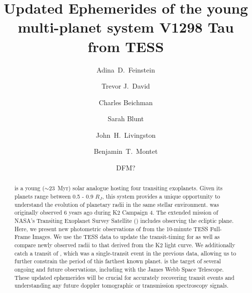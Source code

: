 \documentclass[twocolumn]{aastex631}
\begin{document}
\title{Updated Ephemerides of the young multi-planet system V1298 Tau from TESS}

\author[0000-0002-9464-8101]{Adina~D.~Feinstein}

\author[0000-0001-6534-6246]{Trevor J.\ David}

\author{Charles Beichman}


\author[0000-0002-3199-2888]{Sarah Blunt}


\author[0000-0002-4881-3620]{John~H.~Livingston}

\author[0000-0001-7516-8308]{Benjamin~T.~Montet}

\author{DFM?}

  

\begin{abstract}
\sname is a young ($\sim$23~Myr) solar analogue hosting four transiting exoplanets. Given its planets range between 0.5 - 0.9 $R_J$, this system provides a unique opportunity to understand the evolution of planetary radii in the same stellar environment. \sname was originally observed 6 years ago during K2 Campaign 4. The extended mission of NASA's Transiting Exoplanet Survey Satellite (\tess) includes observing the ecliptic plane. Here, we present new photometric observations of \sname from the 10-minute TESS Full-Frame Images. We use the TESS data to update the transit-timing for \allplanets as well as compare newly observed radii to that derived from the K2 light curve. We additionally catch a transit of \planete, which was a single-transit event in the previous data, allowing us to further constrain the period of this farthest known planet. \sname is the target of several ongoing and future observations, including with the James Webb Space Telescope. These updated ephemerides will be crucial for accurately recovering transit events and understanding any future doppler tomographic or transmission spectroscopy signals.\end{abstract}
\end{document}
